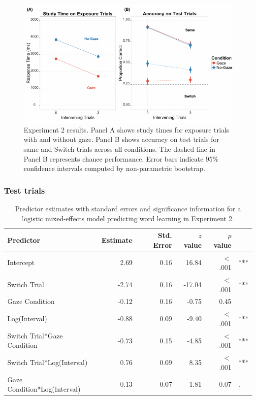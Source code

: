 \documentclass[authoryear, review]{elsarticle}
\newenvironment{CodeChunk}{}{}
\begin{document}
\begin{CodeChunk}
\begin{figure}[tb]
\includegraphics{figs/expt2-plot-1} \caption[Experiment 2 results]{Experiment 2 results. Panel A shows study times for exposure trials with and without gaze. Panel B shows accuracy on test trials for same and Switch trials across all conditions. The dashed line in Panel B represents chance performance. Error bars indicate 95\% confidence intervals computed by non-parametric bootstrap.}\label{fig:expt2-plot}
\end{figure}
\end{CodeChunk}

\subsubsection{Test trials}\label{test-trials-1}

\begin{table}[tb]
\centering
\begin{tabular}{lrrrrl}
 Predictor & Estimate & Std. Error & $z$ value & $p$ value &  \\ 
  \hline
Intercept & 2.69 & 0.16 & 16.84 & $<$ .001 & *** \\ 
  Switch Trial & -2.74 & 0.16 & -17.04 & $<$ .001 & *** \\ 
  Gaze Condition & -0.12 & 0.16 & -0.75 & 0.45 &  \\ 
  Log(Interval) & -0.88 & 0.09 & -9.40 & $<$ .001 & *** \\ 
  Switch Trial*Gaze Condition & -0.73 & 0.15 & -4.85 & $<$ .001 & *** \\ 
  Switch Trial*Log(Interval) & 0.76 & 0.09 & 8.35 & $<$ .001 & *** \\ 
  Gaze Condition*Log(Interval) & 0.13 & 0.07 & 1.81 & 0.07 & . \\ 
   \hline
\end{tabular}
\caption{Predictor estimates with standard errors and significance information for a logistic mixed-effects model predicting word learning in Experiment 2.} 
\label{tab:exp2_reg}
\end{table}
\end{document}
